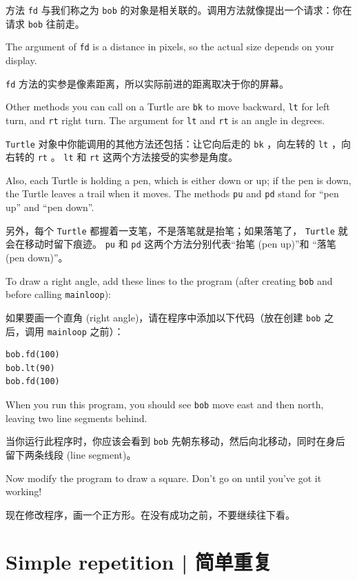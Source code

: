 方法 \lstinline{fd} 与我们称之为 \lstinline{bob} 的对象是相关联的。调用方法就像提出一个请求：你在请求 \lstinline{bob} 往前走。

The argument of {\tt fd} is a distance in pixels, so the actual
size depends on your display.


\lstinline{fd} 方法的实参是像素距离，所以实际前进的距离取决于你的屏幕。

Other methods you can call on a Turtle are {\tt bk} to move
backward, {\tt lt} for left turn, and {\tt rt} right turn.  The
argument for {\tt lt} and {\tt rt} is an angle in degrees.

\lstinline{Turtle} 对象中你能调用的其他方法还包括：让它向后走的 \lstinline{bk} ，向左转的 \lstinline{lt} ，向右转的 \lstinline{rt} 。 \lstinline{lt} 和 \lstinline{rt} 这两个方法接受的实参是角度。

Also, each Turtle is holding a pen, which is
either down or up; if the pen is down, the Turtle leaves
a trail when it moves.  The methods {\tt pu} and {\tt pd}
stand for ``pen up'' and ``pen down''.

另外，每个 \lstinline{Turtle} 都握着一支笔，不是落笔就是抬笔；如果落笔了， \lstinline{Turtle} 就会在移动时留下痕迹。 \lstinline{pu} 和 \lstinline{pd} 这两个方法分别代表``抬笔 (pen up)''和 ``落笔 (pen down)''。

To draw a right angle, add these lines to the program
(after creating {\tt bob} and before calling \verb"mainloop"):

如果要画一个直角 (right angle)，请在程序中添加以下代码（放在创建 \lstinline{bob} 之后，调用 \lstinline{mainloop} 之前）：

\begin{lstlisting}
bob.fd(100)
bob.lt(90)
bob.fd(100)
\end{lstlisting}

%
When you run this program, you should see {\tt bob} move east and then
north, leaving two line segments behind.

当你运行此程序时，你应该会看到 \lstinline{bob} 先朝东移动，然后向北移动，同时在身后留下两条线段 (line segment)。

Now modify the program to draw a square.  Don't go on until
you've got it working!

现在修改程序，画一个正方形。在没有成功之前，不要继续往下看。




\section{Simple repetition  |  简单重复}
\label{repetition}
  

